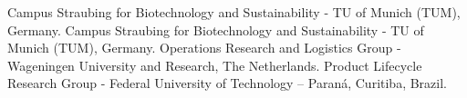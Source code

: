 %
%
%


\begin{projects}
	{Campus Straubing for Biotechnology and Sustainability - TU of Munich (TUM), Germany.}{} 
	{Campus Straubing for Biotechnology and Sustainability - TU of Munich (TUM), Germany.}{} 
	{Operations Research and Logistics Group - Wageningen University and Research, The Netherlands.}{} 
    	{Product Lifecycle Research Group - Federal University of Technology – Paraná, Curitiba, Brazil.}{} 
\end{projects}